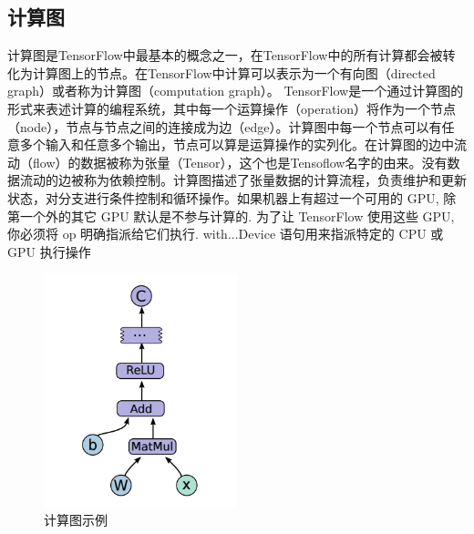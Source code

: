 		\subsection{计算图}
		计算图是TensorFlow中最基本的概念之一，在TensorFlow中的所有计算都会被转化为计算图上的节点。在TensorFlow中计算可以表示为一个有向图（directed graph）或者称为计算图（computation graph）。 
		TensorFlow是一个通过计算图的形式来表述计算的编程系统，其中每一个运算操作（operation）将作为一个节点（node），节点与节点之间的连接成为边（edge）。计算图中每一个节点可以有任意多个输入和任意多个输出，节点可以算是运算操作的实列化。在计算图的边中流动（flow）的数据被称为张量（Tensor），这个也是Tensoflow名字的由来。没有数据流动的边被称为依赖控制。计算图描述了张量数据的计算流程，负责维护和更新状态，对分支进行条件控制和循环操作。如果机器上有超过一个可用的 GPU, 除第一个外的其它 GPU 默认是不参与计算的. 为了让 TensorFlow 使用这些 GPU, 你必须将 op 明确指派给它们执行. with...Device 语句用来指派特定的 CPU 或 GPU 执行操作
		\begin{figure}[!ht]
			\centering
			\includegraphics[width=0.5\textwidth]{figures/2-1}
			\caption{计算图示例}
			\label{fig:2-1}
		\end{figure}
		
